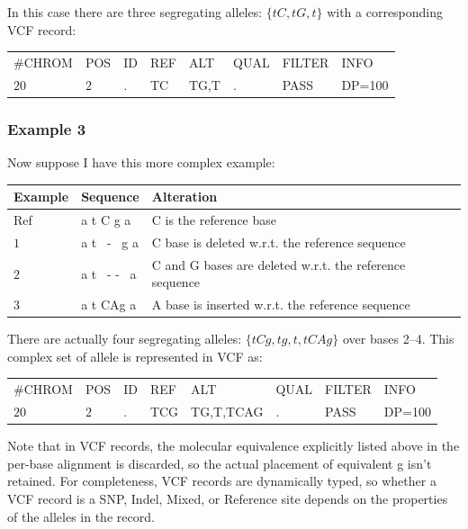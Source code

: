 \documentclass[8pt]{article}
\begin{document}
In this case there are three segregating alleles: $\{tC,tG,t\}$ with a corresponding VCF record:

\vspace{0.3cm}
\begin{tabular}{ l l l l l l l l}
	\#CHROM & POS & ID & REF & ALT & QUAL & FILTER & INFO \\
	$20$ & $2$ & . & TC & TG,T & . & PASS & DP=100 \\
\end{tabular}
\subsubsection{Example 3}
Now suppose I have this more complex example:

\vspace{0.3cm}
\begin{tabular}{ | l | l | l | }
\hline
Example & Sequence & Alteration \\ \hline
Ref & a t C g a & C is the reference base \\ \hline
$1$   & a t \ - \ g a & C base is deleted w.r.t. the reference sequence \\ \hline
$2$   & a t \ - - \ a & C and G bases are deleted w.r.t. the reference sequence\\ \hline
$3$   & a t CAg a & A base is inserted w.r.t. the reference sequence \\ \hline
\end{tabular}

\vspace{0.3cm}
There are actually four segregating alleles: $\{tCg,tg,t,tCAg\}$ over bases 2--4.
This complex set of allele is represented in VCF as:

\vspace{0.3cm}
\begin{tabular}{ l l l l l l l l}
	\#CHROM & POS & ID & REF & ALT & QUAL & FILTER & INFO \\
	$20$ & $2$ & . & TCG & TG,T,TCAG & . & PASS & DP=100 \\
\end{tabular}
\vspace{0.3cm}

Note that in VCF records, the molecular equivalence explicitly listed above in the per-base alignment is discarded, so the actual placement of equivalent g isn't retained.
For completeness, VCF records are dynamically typed, so whether a VCF record is a SNP, Indel, Mixed, or Reference site depends on the properties of the alleles in the record.
\end{document}
